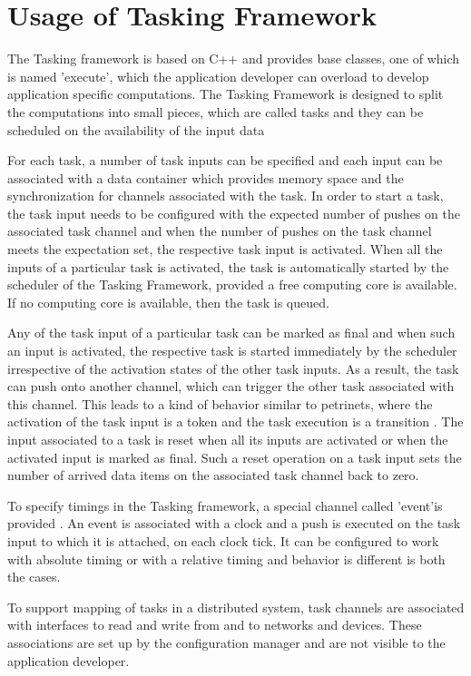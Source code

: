 \section{Usage of Tasking Framework}
The Tasking framework is based on C++ and provides base classes, one of which is named 'execute', which the application developer can overload to develop application specific computations. The Tasking Framework is designed to split the computations into small pieces, which are called tasks and they can be scheduled on the availability of the input data

For each task, a number of task inputs can be specified and each input can be associated with a data container which provides memory space and the synchronization for channels associated with the task. In order to start a task, the task input needs to be configured with the expected number of pushes on the associated task channel and when the number of pushes on the task channel meets the expectation set, the respective task input is activated. When all the inputs of a particular task is activated, the task is automatically started by the scheduler of the Tasking Framework, provided a free computing core is available. If no computing core is available, then the task is queued.

Any of the task input of a particular task can be marked as final and when such an input is activated, the respective task is started immediately by the scheduler irrespective of the activation states of the other task inputs. As a result, the task can push onto another channel, which can trigger the other task associated with this channel. This leads to a kind of behavior similar to petrinets, where the activation of the task input is a token and the task execution is a transition \cite{TaskFr}. The input associated to a task is reset when all its inputs are activated or when the activated input is marked as final. Such a reset operation on a task input sets the number of arrived data items on the associated task channel back to zero.

To specify timings in the Tasking framework, a special channel called 'event'is provided \cite{TaskFr}. An event is associated with a clock and a push is executed on the task input to which it is attached, on each clock tick. It can be configured to work with absolute timing or with a relative timing and behavior is different is both the cases.

To support mapping of tasks in a distributed system, task channels are associated with interfaces to read and write from and to networks and devices. These associations are set up by the configuration manager and are not visible to the application developer.

